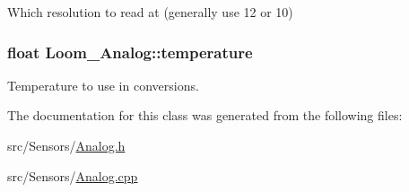 Which resolution to read at (generally use 12 or 10) 

\subsubsection[{\texorpdfstring{temperature}{temperature}}]{\setlength{\rightskip}{0pt plus 5cm}float Loom\+\_\+\+Analog\+::temperature\hspace{0.3cm}{\ttfamily [protected]}}\hypertarget{class_loom___analog_ad01ead292b5fecf5178cd1baf9354ac3}{}\label{class_loom___analog_ad01ead292b5fecf5178cd1baf9354ac3}


Temperature to use in conversions. 



The documentation for this class was generated from the following files\+:\begin{DoxyCompactItemize}
\item 
src/\+Sensors/\hyperlink{_analog_8h}{Analog.\+h}\item 
src/\+Sensors/\hyperlink{_analog_8cpp}{Analog.\+cpp}\end{DoxyCompactItemize}
